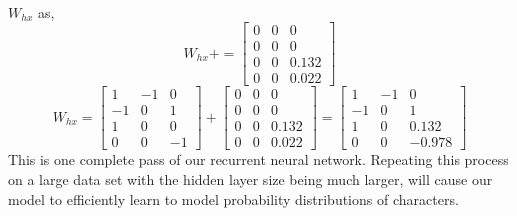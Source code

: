 \documentclass[12pt,letterpaper]{article}
\begin{document}
\\
$W_{hx}$ as,
\[
W_{hx}+=\begin{bmatrix}
0&0&0\\
0&0&0\\
0&0&0.132\\
0&0&0.022
\end{bmatrix}
\]
\[
W_{hx} = \begin{bmatrix}
1 &-1& 0\\
-1& 0& 1\\
1 &0 &0\\
0 &0& -1
\end{bmatrix}+\begin{bmatrix}
0&0&0\\
0&0&0\\
0&0&0.132\\
0&0&0.022
\end{bmatrix}=\begin{bmatrix}
1&-1&0\\
-1&0&1\\
1&0&0.132\\
0&0&-0.978
\end{bmatrix}
\]
This is one complete pass of our recurrent neural network.
Repeating this process on a large data set with the hidden layer size being much larger, will cause our model to efficiently learn to model probability distributions of characters.
\end{document}
